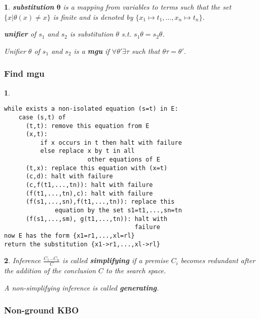 \documentclass[9pt]{extarticle}
\theoremstyle{theoremstyle}
\newtheorem*{green}{}
\newtheorem*{red}{}
\begin{document}
\begin{multicols}{3}
\begin{minipage}[t]{.30\textwidth}
\begin{green}
\textbf{substitution} $\mathbf{\theta}$ is a mapping from variables to terms such that the set $\{x | \theta(x) \not= x\}$ is finite and is denoted by $\{x_1 \mapsto t_1, ..., x_n \mapsto t_n\}$.

\textbf{unifier} of $s_1$ and $s_2$ is substitution $\theta$ s.t. $s_1\theta = s_2\theta$.

Unifier $\theta$ of $s_1$ and $s_2$ is a \textbf{mgu} if $\forall\theta' \exists\tau$ such that $\theta\tau = \theta'$.
\end{green}

\subsubsection*{Find mgu}
\begin{red}
\begin{verbatim}
while exists a non-isolated equation (s=t) in E:
    case (s,t) of
      (t,t): remove this equation from E
      (x,t):
          if x occurs in t then halt with failure
          else replace x by t in all
                       other equations of E
      (t,x): replace this equation with (x=t)
      (c,d): halt with failure
      (c,f(t1,...,tn)): halt with failure
      (f(t1,...,tn),c): halt with failure
      (f(s1,...,sn),f(t1,...,tn)): replace this
              equation by the set s1=t1,...,sn=tn
      (f(s1,...,sm), g(t1,...,tn)): halt with
                                    failure
now E has the form {x1=r1,...,xl=rl}
return the substitution {x1->r1,...,xl->rl}
\end{verbatim}
\end{red}

\begin{green}
Inference $\frac{C_1 ... C_n}{C}$ is called \textbf{simplifying} if a premise $C_i$ becomes redundant after the addition of the conclusion $C$ to the search space.
	
A non-simplifying inference is called \textbf{generating}.
\end{green}

\end{minipage}\hfil

\begin{minipage}[t]{.30\textwidth}

\subsubsection*{Non-ground KBO}


\end{minipage}
\end{multicols}
\end{document}
